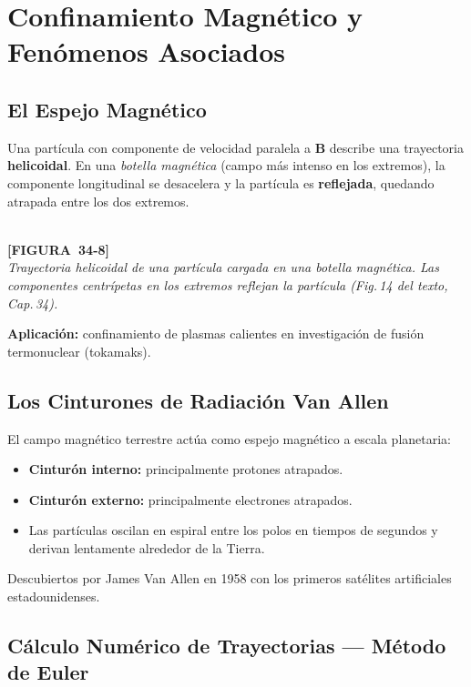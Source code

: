 \documentclass[12pt, letterpaper]{report}
\numberwithin{equation}{section}
\newcommand{\vB}[1]{\boldsymbol{#1}}          %
\newcommand{\figplaceholder}[2]{%
  \begin{tcolorbox}[figbox]
    \centering
    \textcolor{NavyBlue!50}{\rule{0pt}{2.8cm}}\\[4pt]
    {\small\color{NavyBlue}\textbf{[FIGURA\ #1]}\\[2pt]
    \textit{#2}}
  \end{tcolorbox}
}
\begin{document}
\section{Confinamiento Magnético y Fenómenos Asociados}

\subsection{El Espejo Magnético}

Una partícula con componente de velocidad paralela a $\vB{B}$ describe una
trayectoria \textbf{helicoidal}. En una \textit{botella magnética} (campo
más intenso en los extremos), la componente longitudinal se desacelera y la
partícula es \textbf{reflejada}, quedando atrapada entre los dos extremos.

\figplaceholder{34-8}{Trayectoria helicoidal de una partícula cargada en una
botella magnética. Las componentes centrípetas en los extremos reflejan
la partícula (Fig.\,14 del texto, Cap.\,34).}

\textbf{Aplicación:} confinamiento de plasmas calientes en investigación de
fusión termonuclear (tokamaks).

\subsection{Los Cinturones de Radiación Van Allen}

El campo magnético terrestre actúa como espejo magnético a escala planetaria:

\begin{itemize}[leftmargin=1.8em, itemsep=2pt]
  \item \textbf{Cinturón interno:} principalmente protones atrapados.
  \item \textbf{Cinturón externo:} principalmente electrones atrapados.
  \item Las partículas oscilan en espiral entre los polos en tiempos de
        segundos y derivan lentamente alrededor de la Tierra.
\end{itemize}

Descubiertos por James Van Allen en 1958 con los primeros satélites
artificiales estadounidenses.

\subsection{Cálculo Numérico de Trayectorias — Método de Euler}
\end{document}
